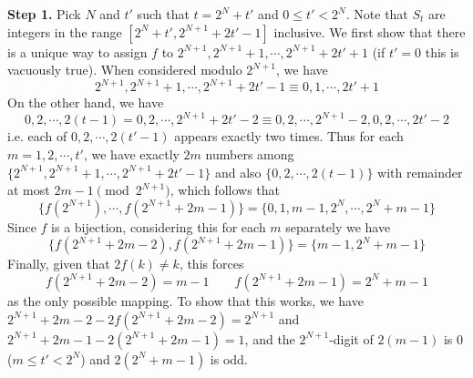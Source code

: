 \documentclass[11pt,a4paper]{article}
\begin{document}
	\textbf{Step 1.} 
	Pick $N$ and $t'$ such that $t = 2^N + t'$ and $0\le t' < 2^N$. 
	Note that $S_t$ are integers in the range $[2^{N} + t', 2^{N + 1} + 2t' - 1]$ inclusive. 
	We first show that there is a unique way to assign $f$ to 
	$2^{N + 1}, 2^{N + 1} + 1, \cdots, 2^{N + 1} + 2t' + 1$ (if $t'=0$ this is vacuously true). 
	When considered modulo $2^{N + 1}$, we have 
	\[
	2^{N + 1}, 2^{N + 1} + 1, \cdots, 2^{N + 1} + 2t' - 1\equiv  0, 1, \cdots, 2t' + 1
	\]
	On the other hand, we have 
	\[
	0, 2, \cdots, 2(t - 1)
	= 0, 2, \cdots, 2^{N + 1} + 2t' - 2
	\equiv 0, 2, \cdots, 2^{N + 1} - 2, 0, 2, \cdots, 2t' - 2
	\]
	i.e. each of $0, 2, \cdots, 2(t' - 1)$ appears exactly two times. 
	Thus for each $m = 1, 2, \cdots, t'$, we have exactly 
	$2m$ numbers among $\{2^{N + 1}, 2^{N + 1} + 1, \cdots, 2^{N + 1} + 2t' - 1\}$ 
	and also $\{0, 2, \cdots, 2(t - 1)\}$ with remainder at most $2m - 1\pmod{2^{N + 1}}$, 
	which follows that 
	\[
	\{f(2^{N + 1}), \cdots, f(2^{N + 1} + 2m - 1)\} = 
	\{0, 1, m - 1, 2^{N}, \cdots, 2^{N} + m - 1\}
	\]
	Since $f$ is a bijection, considering this for each $m$ separately we have 
	\[
	\{f(2^{N + 1} + 2m - 2), f(2^{N + 1} + 2m - 1)\}
	=\{m - 1, 2^N + m - 1\}
	\]
	Finally, given that $2f(k)\neq k$, this forces 
	\[
	f(2^{N + 1} + 2m - 2) = m - 1\qquad f(2^{N + 1} + 2m - 1) = 2^N + m - 1
	\]
	as the only possible mapping. 
	To show that this works, we have 
	$2^{N + 1} + 2m - 2 - 2f(2^{N + 1} + 2m - 2)=2^{N + 1}$ and 
	$2^{N + 1} + 2m - 1 - 2(2^{N + 1} + 2m - 1)=1$, 
	and the $2^{N + 1}$-digit of $2(m - 1)$ is 0 ($m\le t' < 2^N$) and 
	$2(2^N + m - 1)$ is odd. 
	
\end{document}
